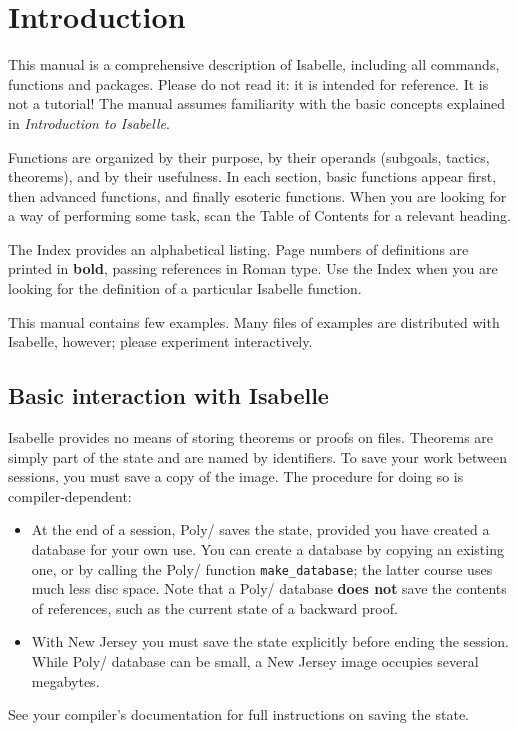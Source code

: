 \maketitle 
{} \tableofcontents \clearfirst

\chapter{Introduction} 
This manual is a comprehensive description of Isabelle, including all
commands, functions and packages.  Please do not read it: it is intended
for reference.  It is not a tutorial!  The manual assumes
familiarity with the basic concepts explained in {\em Introduction to
Isabelle}.

Functions are organized by their purpose, by their operands (subgoals,
tactics, theorems), and by their usefulness.  In each section, basic
functions appear first, then advanced functions, and finally esoteric
functions.  When you are looking for a way of performing some task, scan
the Table of Contents for a relevant heading.

The Index provides an alphabetical listing.  Page numbers of definitions
are printed in {\bf bold}, passing references in Roman type.  Use the Index
when you are looking for the definition of a particular Isabelle function.

This manual contains few examples.  Many files of examples are distributed
with Isabelle, however; please experiment interactively.


\section{Basic interaction with Isabelle}
Isabelle provides no means of storing theorems or proofs on files.
Theorems are simply part of the \ML{} state and are named by \ML{}
identifiers.  To save your work between sessions, you must save a copy of
the \ML{} image.  The procedure for doing so is compiler-dependent:
\begin{itemize}
\item At the end of a session, Poly/\ML{} saves the state, provided you have
created a database for your own use.  You can create a database by copying
an existing one, or by calling the Poly/\ML{} function {\tt make_database};
the latter course uses much less disc space.  Note that a Poly/\ML{}
database {\bf does not} save the contents of references, such as the
current state of a backward proof.

\item With New Jersey \ML{} you must save the state explicitly before
ending the session.  While Poly/\ML{} database can be small, a New Jersey
image occupies several megabytes.
\end{itemize}
See your \ML{} compiler's documentation for full instructions on saving the
state.

